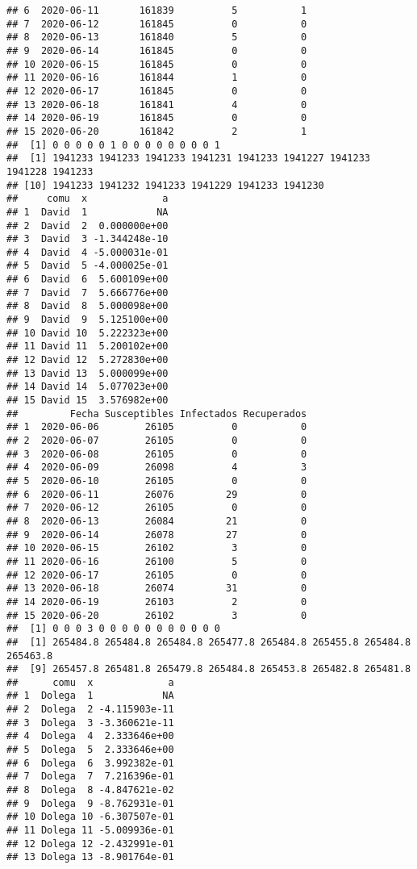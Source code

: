 \documentclass[
]{article}
\begin{document}
\begin{verbatim}
## 6  2020-06-11       161839          5           1
## 7  2020-06-12       161845          0           0
## 8  2020-06-13       161840          5           0
## 9  2020-06-14       161845          0           0
## 10 2020-06-15       161845          0           0
## 11 2020-06-16       161844          1           0
## 12 2020-06-17       161845          0           0
## 13 2020-06-18       161841          4           0
## 14 2020-06-19       161845          0           0
## 15 2020-06-20       161842          2           1
##  [1] 0 0 0 0 0 1 0 0 0 0 0 0 0 0 1
##  [1] 1941233 1941233 1941233 1941231 1941233 1941227 1941233 1941228 1941233
## [10] 1941233 1941232 1941233 1941229 1941233 1941230
##     comu  x             a
## 1  David  1            NA
## 2  David  2  0.000000e+00
## 3  David  3 -1.344248e-10
## 4  David  4 -5.000031e-01
## 5  David  5 -4.000025e-01
## 6  David  6  5.600109e+00
## 7  David  7  5.666776e+00
## 8  David  8  5.000098e+00
## 9  David  9  5.125100e+00
## 10 David 10  5.222323e+00
## 11 David 11  5.200102e+00
## 12 David 12  5.272830e+00
## 13 David 13  5.000099e+00
## 14 David 14  5.077023e+00
## 15 David 15  3.576982e+00
##         Fecha Susceptibles Infectados Recuperados
## 1  2020-06-06        26105          0           0
## 2  2020-06-07        26105          0           0
## 3  2020-06-08        26105          0           0
## 4  2020-06-09        26098          4           3
## 5  2020-06-10        26105          0           0
## 6  2020-06-11        26076         29           0
## 7  2020-06-12        26105          0           0
## 8  2020-06-13        26084         21           0
## 9  2020-06-14        26078         27           0
## 10 2020-06-15        26102          3           0
## 11 2020-06-16        26100          5           0
## 12 2020-06-17        26105          0           0
## 13 2020-06-18        26074         31           0
## 14 2020-06-19        26103          2           0
## 15 2020-06-20        26102          3           0
##  [1] 0 0 0 3 0 0 0 0 0 0 0 0 0 0 0
##  [1] 265484.8 265484.8 265484.8 265477.8 265484.8 265455.8 265484.8 265463.8
##  [9] 265457.8 265481.8 265479.8 265484.8 265453.8 265482.8 265481.8
##      comu  x             a
## 1  Dolega  1            NA
## 2  Dolega  2 -4.115903e-11
## 3  Dolega  3 -3.360621e-11
## 4  Dolega  4  2.333646e+00
## 5  Dolega  5  2.333646e+00
## 6  Dolega  6  3.992382e-01
## 7  Dolega  7  7.216396e-01
## 8  Dolega  8 -4.847621e-02
## 9  Dolega  9 -8.762931e-01
## 10 Dolega 10 -6.307507e-01
## 11 Dolega 11 -5.009936e-01
## 12 Dolega 12 -2.432991e-01
## 13 Dolega 13 -8.901764e-01

\end{verbatim}
\end{document}
